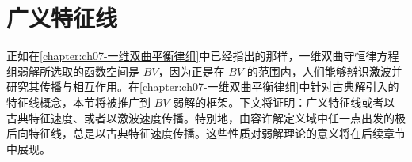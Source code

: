 \documentclass[../main.tex]{subfiles}
\begin{document}
\chapter{广义特征线}\label{chapter:ch10-广义特征线}

正如在\cref{chapter:ch07-一维双曲平衡律组}中已经指出的那样，一维双曲守恒律方程组弱解所选取的函数空间是 $BV$，因为正是在 $BV$ 的范围内，人们能够辨识激波并研究其传播与相互作用。在\cref{chapter:ch07-一维双曲平衡律组}中针对古典解引入的特征线概念，本节将被推广到 $BV$ 弱解的框架。下文将证明：广义特征线或者以古典特征速度、或者以激波速度传播。特别地，由容许解定义域中任一点出发的极后向特征线，总是以古典特征速度传播。这些性质对弱解理论的意义将在后续章节中展现。






\end{document}

